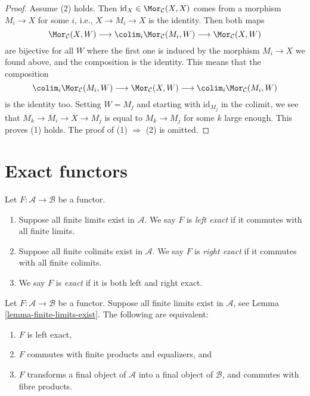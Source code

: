 \begin{proof}
Assume (2) holds. Then $\text{id}_X \in \Mor_\mathcal{C}(X, X)$
comes from a morphism $M_i \to X$ for some $i$, i.e., $X \to M_i \to X$
is the identity. Then both maps
$$
\Mor_\mathcal{C}(X, W)
\longrightarrow
\colim_i \Mor_\mathcal{C}(M_i, W)
\longrightarrow
\Mor_\mathcal{C}(X, W)
$$
are bijective for all $W$ where the first one is induced by the morphism
$M_i \to X$ we found above, and the composition is the identity. This means
that the composition
$$
\colim_i \Mor_\mathcal{C}(M_i, W)
\longrightarrow
\Mor_\mathcal{C}(X, W)
\longrightarrow
\colim_i \Mor_\mathcal{C}(M_i, W)
$$
is the identity too. Setting $W = M_j$ and starting with $\text{id}_{M_j}$
in the colimit, we see that $M_k \to M_i \to X \to M_j$ is equal to
$M_k \to M_j$ for some $k$ large enough. This proves (1) holds.
The proof of (1) $\Rightarrow$ (2) is omitted.
\end{proof}




\section{Exact functors}
\label{section-exact-functor}


\begin{definition}
\label{definition-exact}
Let $F : \mathcal{A} \to \mathcal{B}$ be a functor.
\begin{enumerate}
\item Suppose all finite limits exist in $\mathcal{A}$.
We say $F$ is {\it left exact} if it commutes
with all finite limits.
\item Suppose all finite colimits exist in $\mathcal{A}$.
We say $F$ is {\it right exact} if it commutes
with all finite colimits.
\item We say $F$ is {\it exact} if it is both left and right
exact.
\end{enumerate}
\end{definition}

\begin{lemma}
\label{lemma-characterize-left-exact}
Let $F : \mathcal{A} \to \mathcal{B}$ be a functor.
Suppose all finite limits exist in $\mathcal{A}$,
see Lemma \ref{lemma-finite-limits-exist}.
The following are equivalent:
\begin{enumerate}
\item $F$ is left exact,
\item $F$ commutes with finite products and equalizers, and
\item $F$ transforms a final object of $\mathcal{A}$
into a final object of $\mathcal{B}$, and commutes with fibre products.
\end{enumerate}
\end{lemma}

